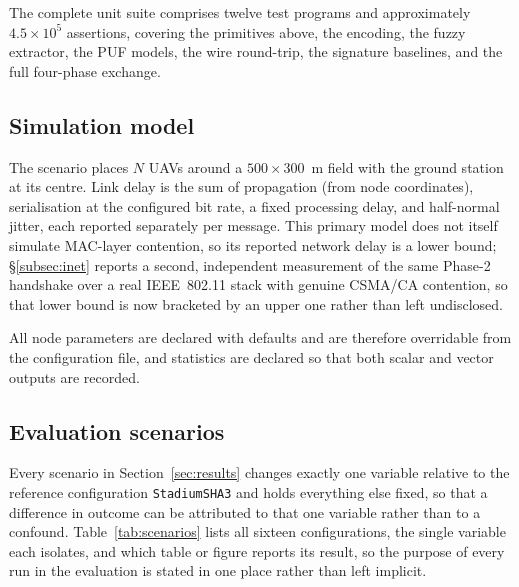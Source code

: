 \documentclass[11pt,a4paper]{article}
\begin{document}
The complete unit suite comprises twelve test programs and approximately
$4.5\times10^{5}$ assertions, covering the primitives above, the encoding, the
fuzzy extractor, the PUF models, the wire round-trip, the signature baselines, and
the full four-phase exchange.

\subsection{Simulation model}
\label{subsec:simmodel}

The scenario places $N$ UAVs around a $500\times300$~m field with the ground
station at its centre. Link delay is the sum of propagation (from node
coordinates), serialisation at the configured bit rate, a fixed processing delay,
and half-normal jitter, each reported separately per message. This primary model
does not itself simulate MAC-layer contention, so its reported network delay is a
lower bound; \S\ref{subsec:inet} reports a second, independent measurement of the
same Phase-2 handshake over a real IEEE~802.11 stack with genuine CSMA/CA
contention, so that lower bound is now bracketed by an upper one rather than left
undisclosed.

All node parameters are declared with defaults and are therefore overridable from
the configuration file, and statistics are declared so that both scalar and vector
outputs are recorded.

\subsection{Evaluation scenarios}
\label{subsec:scenarios}

Every scenario in Section~\ref{sec:results} changes exactly one variable relative
to the reference configuration \texttt{StadiumSHA3} and holds everything else
fixed, so that a difference in outcome can be attributed to that one variable
rather than to a confound. Table~\ref{tab:scenarios} lists all sixteen
configurations, the single variable each isolates, and which table or figure
reports its result, so the purpose of every run in the evaluation is stated in
one place rather than left implicit.
\end{document}
